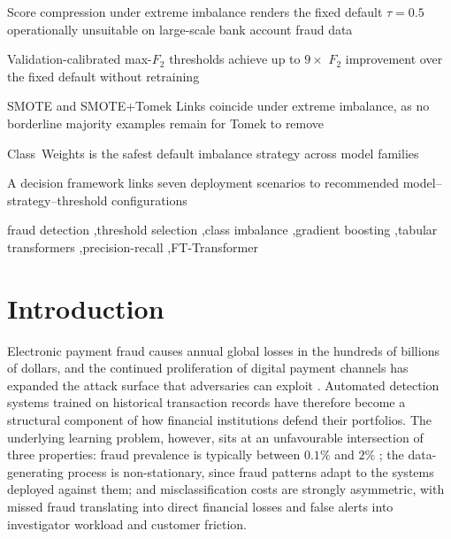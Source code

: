 \documentclass[a4paper,fleqn]{cas-sc}
\begin{document}
\begin{highlights}
\item Score compression under extreme imbalance renders the fixed default $\tau{=}0.5$ operationally unsuitable on large-scale bank account fraud data
\item Validation-calibrated max-$F_2$ thresholds achieve up to $9{\times}$ $F_2$ improvement over the fixed default without retraining
\item SMOTE and SMOTE+Tomek Links coincide under extreme imbalance, as no borderline majority examples remain for Tomek to remove
\item Class~Weights is the safest default imbalance strategy across model families
\item A decision framework links seven deployment scenarios to recommended model--strategy--threshold configurations
\end{highlights}


\begin{keywords}
  fraud detection \sep threshold selection \sep class imbalance \sep gradient boosting
  \sep tabular transformers \sep precision-recall \sep FT-Transformer
\end{keywords}

\maketitle

\section{Introduction}
\label{sec:intro}

Electronic payment fraud causes annual global losses in the hundreds of billions of
dollars, and the continued proliferation of digital payment channels has expanded the
attack surface that adversaries can exploit \citep{rymantubb2018survey}.
Automated detection systems trained on historical transaction records have therefore
become a structural component of how financial institutions defend their portfolios.
The underlying learning problem, however, sits at an unfavourable intersection of three
properties: fraud prevalence is typically between $0.1\%$ and $2\%$
\citep{hegarcia2009learning}; the data-generating process is non-stationary, since
fraud patterns adapt to the systems deployed against them; and misclassification costs
are strongly asymmetric, with missed fraud translating into direct financial losses and
false alerts into investigator workload and customer friction.
\end{document}
